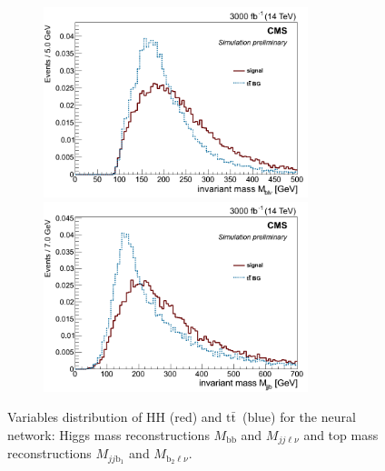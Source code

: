 \documentclass[10pt,a4paper]{article}
\newcommand{\ww}{7.7cm} %
\newcommand{\dd}{-2mm} %
\renewcommand{\tt}{$\text{t}\bar{\text{t}}$}
\newcommand{\lnu}{$\ell\nu$}
\newcommand{\bb}{\text{bb}}
\begin{document}
\begin{figure}[h]
  \begin{subfigure}[b]{17cm}
    \begin{minipage}[h!]{\ww}
      \centering
      \includegraphics[width=\ww]{figs/M_blnu.png}
    \end{minipage}
    \begin{minipage}[h!]{\ww}
      \centering
      \includegraphics[width=\ww]{figs/M_jjb.png}
    \end{minipage}
    \hspace{9mm}
  \end{subfigure}	
  \vspace{\dd}
  \caption{Variables distribution of HH (red) and \tt\ (blue) for the neural network: Higgs mass reconstructions $M_{\bb}$ and $M_{jj\ell\nu}$ and top mass reconstructions $M_{jj\text{b}_1}$ and $M_{\text{b}_2\text{\lnu}}$.} \label{vars7}

\end{figure}
\end{document}
